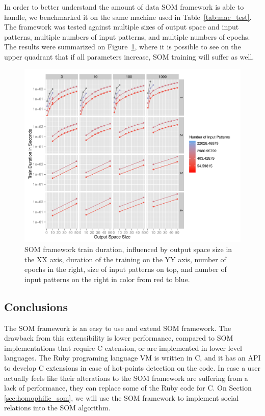 In order to better understand the amount of data \ac{SOM} framework is able to handle, we benchmarked it on the same machine used in Table~\ref{tab:mac_test}. The framework was tested against multiple sizes of output space and input patterns, multiple numbers of input patterns, and multiple numbers of epochs. 
The results were summarized on Figure~\ref{fig:benchmarkingsom}, where it is possible to see on the upper quadrant that if all parameters increase, \ac{SOM} training will suffer as well.

\begin{figure}[h!]
  \centering
  \includegraphics[width=0.8\linewidth]{./plots/som/benchmarking.pdf}
  \caption{SOM framework train duration, influenced by output space size in the XX axis, duration of the training on the YY axis, number of epochs in the right, size of input patterns on top, and number of input patterns on the right in color from red to blue.}
  \label{fig:benchmarkingsom}
\end{figure}

\subsection{Conclusions}
\label{sub:conclusionssom}
The \ac{SOM} framework is an easy to use and extend \ac{SOM} framework. The drawback from this extensibility is lower performance, compared to \ac{SOM} implementations that require C extension, or are implemented in lower level languages. 
The Ruby programing language \ac{VM} is written in C, and it has an API to develop C extensions in case of  hot-points detection on the code. In case a user actually feels like their alterations to the \ac{SOM} framework are suffering from a lack of performance, they can replace some of the Ruby code for C. 
On Section \ref{sec:homophilic_som}, we will use the \ac{SOM} framework to implement social relations into the \ac{SOM} algorithm.



